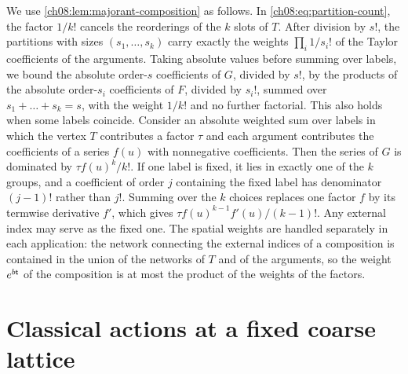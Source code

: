 We use \cref{ch08:lem:majorant-composition} as follows. In \eqref{ch08:eq:partition-count}, the factor $1/k!$ cancels the reorderings of the $k$ slots of $T$. After division by $s!$, the partitions with sizes $(s_1,\dots,s_k)$ carry exactly the weights $\prod_i1/s_i!$ of the Taylor coefficients of the arguments. Taking absolute values before summing over labels, we bound the absolute order-$s$ coefficients of $G$, divided by $s!$, by the products of the absolute order-$s_i$ coefficients of $F$, divided by $s_i!$, summed over $s_1+\dots+s_k=s$, with the weight $1/k!$ and no further factorial. This also holds when some labels coincide. Consider an absolute weighted sum over labels in which the vertex $T$ contributes a factor $\tau$ and each argument contributes the coefficients of a series $f(u)$ with nonnegative coefficients. Then the series of $G$ is dominated by $\tau f(u)^k/k!$. If one label is fixed, it lies in exactly one of the $k$ groups, and a coefficient of order $j$ containing the fixed label has denominator $(j-1)!$ rather than $j!$. Summing over the $k$ choices replaces one factor $f$ by its termwise derivative $f'$, which gives $\tau f(u)^{k-1}f'(u)/(k-1)!$. Any external index may serve as the fixed one. The spatial weights are handled separately in each application: the network connecting the external indices of a composition is contained in the union of the networks of $T$ and of the arguments, so the weight $e^{b\mathsf t}$ of the composition is at most the product of the weights of the factors.

\section{Classical actions at a fixed coarse lattice}\label{ch08:sec:refinement}

